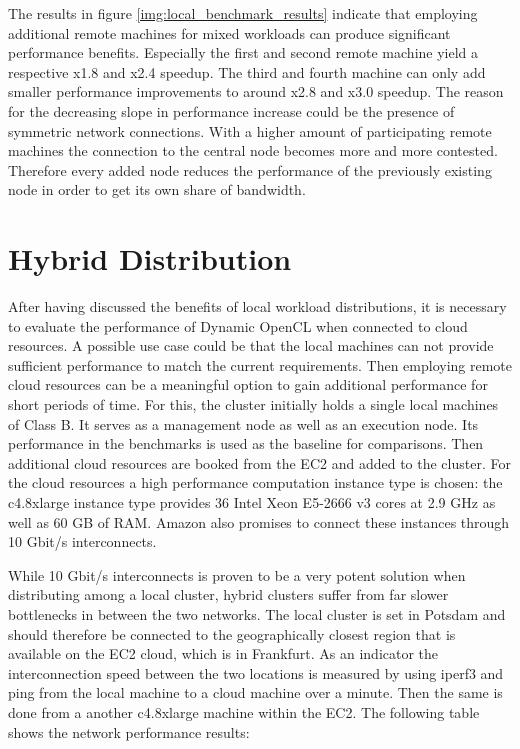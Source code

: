 The results in figure \ref{img:local_benchmark_results} indicate that employing additional remote machines for mixed workloads can produce significant performance benefits. Especially the first and second remote machine yield a respective x1.8 and x2.4 speedup. The third and fourth machine can only add smaller performance improvements to around x2.8 and x3.0 speedup. The reason for the decreasing slope in performance increase could be the presence of symmetric network connections. With a higher amount of participating remote machines the connection to the central node becomes more and more contested. Therefore every added node reduces the performance of the previously existing node in order to get its own share of bandwidth.


\section{Hybrid Distribution}

After having discussed the benefits of local workload distributions, it is necessary to evaluate the performance of Dynamic OpenCL when connected to cloud resources. A possible use case could be that the local machines can not provide sufficient performance to match the current requirements. Then employing remote cloud resources can be a meaningful option to gain additional performance for short periods of time. For this, the cluster initially holds a single local machines of Class B. It serves as a management node as well as an execution node. Its performance in the benchmarks is used as the baseline for comparisons. Then additional cloud resources are booked from the EC2 and added to the cluster. For the cloud resources a high performance computation instance type is chosen: the c4.8xlarge instance type provides 36 Intel Xeon E5-2666 v3 cores at 2.9 GHz as well as 60 GB of RAM. Amazon also promises to connect these instances through 10 Gbit/s interconnects.

While 10 Gbit/s interconnects is proven to be a very potent solution when distributing among a local cluster, hybrid clusters suffer from far slower bottlenecks in between the two networks. The local cluster is set in Potsdam and should therefore be connected to the geographically closest region that is available on the EC2 cloud, which is in Frankfurt. As an indicator the interconnection speed between the two locations is measured by using iperf3 and ping from the local machine to a cloud machine over a minute. Then the same is done from a another c4.8xlarge machine within the EC2. The following table shows the network performance results:

